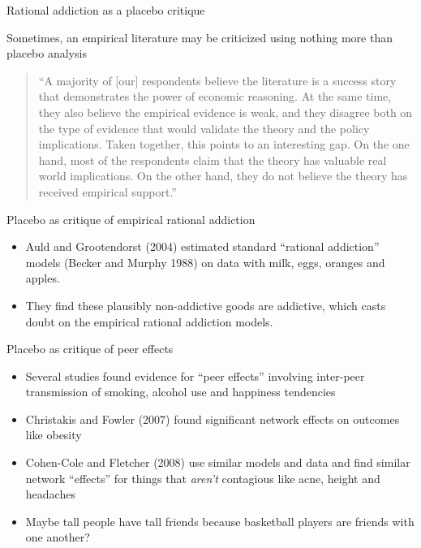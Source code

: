 \documentclass{beamer}
\begin{document}
\begin{frame}{Rational addiction as a placebo critique}


Sometimes, an empirical literature may be criticized using nothing more than placebo analysis

\begin{quote}``A majority of [our] respondents believe the literature is a success story that demonstrates the power of economic reasoning.  At the same time, they also believe the empirical evidence is weak, and they disagree both on the type of evidence that would validate the theory and the policy implications. Taken together, this points to an interesting gap.  On the one hand, most of the respondents claim that the theory has valuable real world implications.  On the other hand, they do not believe the theory has received empirical support.''
\end{quote}

\end{frame}

\begin{frame}{Placebo as critique of empirical rational addiction}

\begin{itemize}
	\item Auld and Grootendorst (2004) estimated standard ``rational addiction'' models (Becker and Murphy 1988) on data with milk, eggs, oranges and apples.
	\item They find these plausibly non-addictive goods are addictive, which casts doubt on the empirical rational addiction models.
\end{itemize}

\end{frame}

\begin{frame}{Placebo as critique of peer effects}

\begin{itemize}
	\item Several studies found evidence for ``peer effects'' involving inter-peer transmission of smoking, alcohol use and happiness tendencies
	\item Christakis and Fowler (2007) found significant network effects on outcomes like obesity
	\item Cohen-Cole and Fletcher (2008) use similar models and data and find similar network ``effects'' for things that \emph{aren't} contagious like acne, height and headaches
	\item Maybe tall people have tall friends because basketball players are friends with one another?
\end{itemize}

\end{frame}
\end{document}
